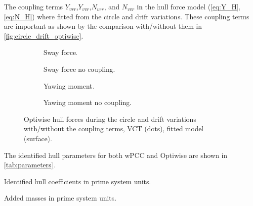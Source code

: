 The coupling terms $Y_{vrr}$,$Y_{vvr}$,$N_{vrr}$, and $N_{vvr}$ in the hull force model (\autoref{eq:Y_H}, \autoref{eq:N_H}) where fitted from the circle and drift variations. These coupling terms are important as shown by the comparison with/without them in \autoref{fig:circle_drift_optiwise}.
\begin{figure}[h]
     \centering
     \begin{subfigure}[b]{0.49\textwidth}
         \centering
         
        \caption{Sway force.}
        \label{fig:circle_drift_Y_H_optiwise}
     \end{subfigure}
     \hfill
     \begin{subfigure}[b]{0.49\textwidth}
         \centering
         
        \caption{Sway force no coupling.}
        \label{fig:circle_drift_Y_H_no_coupling_optiwise}
     \end{subfigure}

     \vfill
     \begin{subfigure}[b]{0.49\textwidth}
         \centering
         
        \caption{Yawing moment.}
        \label{fig:circle_drift_N_H_optiwise}
     \end{subfigure}
     \hfill
     \begin{subfigure}[b]{0.49\textwidth}
         \centering
         
        \caption{Yawing moment no coupling.}
        \label{fig:circle_drift_N_H_no_coupling_optiwise}
     \end{subfigure}
     
    \caption{Optiwise hull forces during the circle and drift variations with/without the coupling terms, VCT (dots), fitted model (surface).}
    \label{fig:circle_drift_optiwise}
\end{figure}

The identified hull parameters for both wPCC and Optiwise are shown in \autoref{tab:parameters}.
\begin{table}[h]
    \centering
    \caption{Identified hull coefficients in prime system units.}
    \label{tab:parameters}
\end{table}
\begin{table}[h]
    \centering
    \caption{Added masses in prime system units.}
    \label{tab:added_masses}
\end{table}